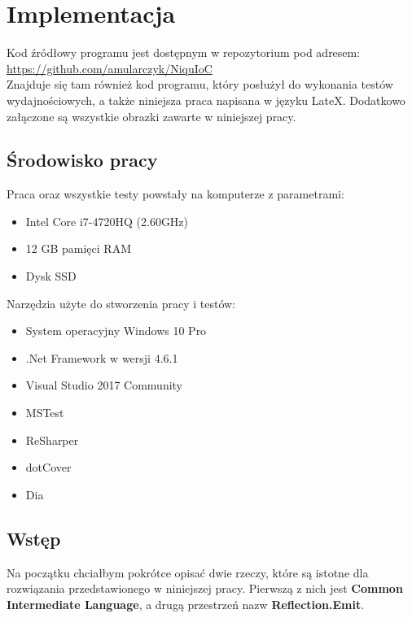 \documentclass[12pt]{article}
\begin{document}
\clearpage
\section{Implementacja}
Kod źródłowy programu jest dostępnym w repozytorium pod adresem:\\
\url{https://github.com/amularczyk/NiquIoC}\\
Znajduje się tam również kod programu, który posłużył do wykonania testów wydajnościowych, a także niniejsza praca napisana w języku LateX. Dodatkowo załączone są wszystkie obrazki zawarte w niniejszej pracy.

\subsection{Środowisko pracy}
Praca oraz wszystkie testy powstały na komputerze z parametrami:
\begin{itemize}
	\item Intel Core i7-4720HQ (2.60GHz)
	\item 12 GB pamięci RAM
	\item Dysk SSD
\end{itemize}
Narzędzia użyte do stworzenia pracy i testów:
\begin{itemize}
	\item System operacyjny Windows 10 Pro
	\item .Net Framework w wersji 4.6.1
	\item Visual Studio 2017 Community
	\item MSTest
	\item ReSharper
	\item dotCover
	\item Dia
\end{itemize}


\subsection{Wstęp}
Na początku chciałbym pokrótce opisać dwie rzeczy, które są istotne dla rozwiązania przedstawionego w niniejszej pracy. Pierwszą z nich jest \textbf{Common Intermediate Language}, a drugą przestrzeń nazw \textbf{Reflection.Emit}.
\end{document}
